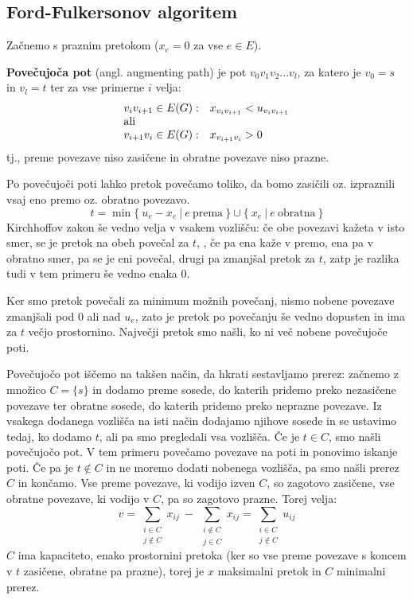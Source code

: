 \documentclass[11pt, a4paper]{article}
\begin{document}
    \subsection{Ford-Fulkersonov algoritem}

    Začnemo s praznim pretokom (\(x_e =  0\) za vse \(e \in E\)).

    \begin{definition}
        \textbf{Povečujoča pot} (angl. augmenting path) je pot \(v_0 v_1 v_2 ... v_l\), za katero je \(v_0 = s\) in \(v_l = t\) ter za vse primerne \(i\) velja:
        \[
            \begin{array}{l l}
                v_i v_{i+1} \in E(G): & x_{v_i v_{i+1}} < u_{v_i v_{i+1}} \\
                \text{ali} \\
                v_{i+1} v_i \in E(G): & x_{v_{i+1} v_i} > 0
            \end{array}
        \]
        tj., preme povezave niso zasičene in obratne povezave niso prazne.
    \end{definition}

    Po povečujoči poti lahko pretok povečamo toliko, da bomo zasičili oz. izpraznili vsaj eno premo oz. obratno povezavo.
    \[
        t = \min \{\ u_e - x_e\ |\ e\ \text{prema}\ \} \cup \{\ x_e\ |\ e\ \text{obratna}\ \}
    \]
    Kirchhoffov zakon še vedno velja v vsakem vozlišču: če obe povezavi kažeta v isto smer, se je pretok na obeh povečal za \(t\), , če pa ena kaže v premo, ena pa v obratno smer, pa se je eni povečal, drugi pa zmanjšal pretok za \(t\), zatp je razlika tudi v tem primeru še vedno enaka \(0\).
    \par
    Ker smo pretok povečali za minimum možnih povečanj, nismo nobene povezave zmanjšali pod 0 ali nad \(u_e\), zato je pretok po povečanju še vedno dopusten in ima za \(t\) večjo prostornino. Največji pretok smo našli, ko ni več nobene povečujoče poti.
    \par
    Povečujočo pot iščemo na takšen način, da hkrati sestavljamo prerez: začnemo z množico \(C=\{s\}\) in dodamo preme sosede, do katerih pridemo preko nezasičene povezave ter obratne sosede, do katerih pridemo preko neprazne povezave. Iz vsakega dodanega vozlišča na isti način dodajamo njihove sosede in se ustavimo tedaj, ko dodamo \(t\), ali pa smo pregledali vsa vozlišča. Če je \(t \in C\), smo našli povečujočo pot. V tem primeru povečamo povezave na poti in ponovimo iskanje poti. Če pa je \(t \notin C\) in ne moremo dodati nobenega vozlišča, pa smo našli prerez \(C\) in končamo. Vse preme povezave, ki vodijo izven \(C\), so zagotovo zasičene, vse obratne povezave, ki vodijo v \(C\), pa so zagotovo prazne. Torej velja:
    \[
        v = \sum_{\substack{i \in C \\ j \notin C}} x_{ij}\ -\ \sum_{\substack{i \notin C \\ j \in C}} x_{ij} = \sum_{\substack{i \in C \\ j \notin C}} u_{ij}
    \]
    \(C\) ima kapaciteto, enako prostornini pretoka (ker so vse preme povezave s koncem v \(t\) zasičene, obratne pa prazne), torej je \(x\) maksimalni pretok in \(C\) minimalni prerez.
\end{document}
